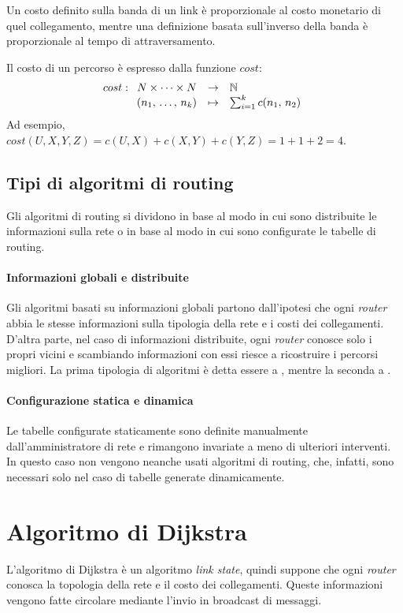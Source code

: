 \begin{note}
    Un costo definito sulla banda di un link è proporzionale al costo monetario
    di quel collegamento, mentre una definizione basata sull'inverso della banda
    è proporzionale al tempo di attraversamento.
\end{note}\noindent
Il costo di un percorso è espresso dalla funzione $cost$:
\[cost:\begin{array}[t]{ccl}
    N\times\dots\times N & \to & \mathbb{N}\\
    (n_1,\,\dots,\,n_k) & \mapsto & \sum_{i=1}^k c(n_1,\,n_2)
\end{array}\]
Ad esempio, $cost(U,X,Y,Z)=c(U,X)+c(X,Y)+c(Y,Z)=1+1+2=4$.

\subsection{Tipi di algoritmi di routing}
Gli algoritmi di routing si dividono in base al modo in cui sono distribuite le
informazioni sulla rete o in base al modo in cui sono configurate le tabelle di
routing.

\paragraph{Informazioni globali e distribuite}
Gli algoritmi basati su informazioni globali partono dall'ipotesi che ogni
\emph{router} abbia le stesse informazioni sulla tipologia della rete e i costi
dei collegamenti. D'altra parte, nel caso di informazioni distribuite, ogni
\emph{router} conosce solo i propri vicini e scambiando informazioni con essi
riesce a ricostruire i percorsi migliori. La prima tipologia di algoritmi è
detta essere a , mentre la seconda a
.

\paragraph{Configurazione statica e dinamica}
Le tabelle configurate staticamente sono definite manualmente
dall'amministratore di rete e rimangono invariate a meno di ulteriori interventi.
In questo caso non vengono neanche usati algoritmi di routing, che, infatti, sono
necessari solo nel caso di tabelle generate dinamicamente.

\section{Algoritmo di Dijkstra}
L'algoritmo di Dijkstra è un algoritmo \emph{link state}, quindi suppone che ogni
\emph{router} conosca la topologia della rete e il costo dei collegamenti.
Queste informazioni vengono fatte circolare mediante l'invio in broadcast di
messaggi.

